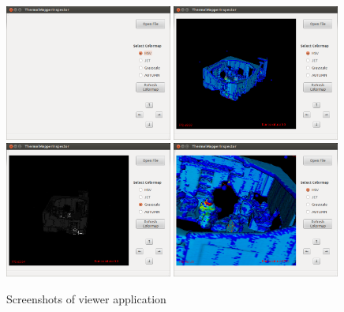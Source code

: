 \documentclass[11pt]{article} %
\begin{document}
\begin{center}
\begin{figure}[h]
\includegraphics[width=0.49\textwidth]{take1} \includegraphics[width=0.49\textwidth]{take2} \\
\includegraphics[width=0.49\textwidth]{take3} \includegraphics[width=0.49\textwidth]{take4}
\caption{Screenshots of viewer application\label{fig:viewer}}
\end{figure}
\end{center}
\end{document}

